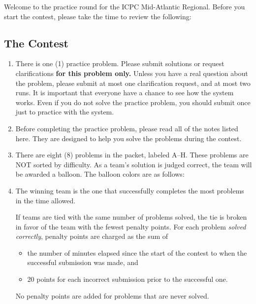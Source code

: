 Welcome to the
\ifPRACTICE
 practice round for the
 ICPC Mid-Atlantic Regional.  Before you start the
contest, please take the time to review the following:

\subsection*{The Contest}


\begin{enumerate} 
\ifPRACTICE
\item There is one (1) practice problem.  Please submit solutions or
  request clarifications {\bfseries for this problem only.}  Unless
  you have a real question about the problem, please submit at most
  one clarification request, and at most two runs.  It is important
  that everyone have a chance to see how the system works. Even if you
  do not solve the practice problem, you should submit once just to
  practice with the system.

\item Before completing the practice problem, please
  read all of the notes listed here.  They are designed to help you
  solve the problems during the contest.

\else
\item There are eight (8) problems in the packet, labeled A--H.
  These problems are NOT sorted by difficulty.  As a
  team's solution is judged correct, the team will be awarded a
  balloon.  The balloon colors are as follows:

\fi


\item The winning team is the one that successfully completes the most
    problems in the time allowed. 

    If teams are tied with the same number of problems solved, the tie
  is broken in favor of the team with the fewest penalty points. 
  For each problem
  {\em solved correctly}, penalty points are charged as the sum of

    \begin{itemize}
    \item the number of minutes elapsed since the start of the contest
       to when the successful submission was made, and
    \item 20 points for each incorrect submission prior to the
    successful one.
    \end{itemize}
  No penalty points are added for problems that are never
  solved.  
  

\end{enumerate}

